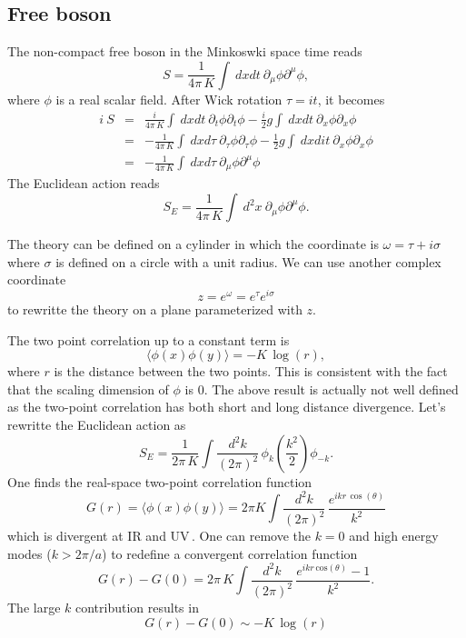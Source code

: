 \documentclass[submission, PhysLectNotes]{SciPost}
\begin{document}
\subsection{Free boson}
The non-compact free boson in the Minkoswki space time reads
\begin{equation}
    S = \frac{1}{4\pi\,K}\int \ dxdt \ \partial_\mu \phi \partial^\mu \phi,
\end{equation}
where $\phi$ is a real scalar field. After Wick rotation $\tau = it$, it becomes
\begin{eqnarray}
    i\ S &=& \frac{i}{4\pi\,K}\int \ dxdt \ \partial_t \phi \partial_t \phi - \frac{i}{2}g\int \ dxdt \ \partial_x \phi \partial_x \phi \nonumber \\
    &=& -\frac{1}{4\pi\,K}\int \ dxd\tau \ \partial_\tau \phi \partial_\tau \phi - \frac{1}{2}g\int \ dxdit \ \partial_x \phi \partial_x \phi \nonumber \\
    &=& -\frac{1}{4\pi\,K}\int \ dxd\tau \ \partial_\mu \phi \partial^\mu \phi
\end{eqnarray}
The Euclidean action reads
\begin{equation}
    S_E = \frac{1}{4\pi\,K}\int \ d^2x \ \partial_\mu \phi \partial^\mu \phi.
\end{equation}

The theory can be defined on a cylinder in which the coordinate is $\omega = \tau + i\sigma$ where $\sigma$ is defined on a circle with a unit radius. We can use another complex coordinate
\begin{equation}
  z = e^\omega = e^\tau e^{i\sigma}
\end{equation}
to rewritte the theory on a plane parameterized with $z$.

The two point correlation up to a constant term is
\begin{equation}
    \langle \phi(x) \phi(y) \rangle = -K\,\mathrm{\log} (r),
\end{equation}
where $r$ is the distance between the two points. This is consistent with the fact that the scaling dimension of $\phi$ is 0. The above result is actually not well defined as the two-point correlation has both short and long distance divergence. Let's rewritte the Euclidean action as 
\begin{equation}
	S_E = \frac{1}{2\pi\,K} \int\frac{d^2k}{(2\pi)^2} \, \phi_k \left(\frac{k^2}{2}\right)\phi_{-k}.
\end{equation} 
One finds the real-space two-point correlation function
\begin{equation}
	G(r) = \langle \phi(x) \phi(y) \rangle = 2\pi K \int \frac{d^2k}{(2\pi)^2}\, \frac{e^{ikr\,\cos(\theta)}}{k^2}
\end{equation}
which is divergent at IR and UV\,. One can remove the $k=0$ and high energy modes ($k>2\pi/a$) to redefine a convergent correlation function 
\begin{equation}
	G(r) - G(0) = 2\pi\,K \int \frac{d^2k}{(2\pi)^2}\, \frac{e^{ikr\,\mathrm{cos}(\theta)}-1}{k^2}.
\end{equation}
The large $k$ contribution results in
\begin{equation}
	G(r) - G(0) \sim -K\,\log(r)
\end{equation}
\end{document}
